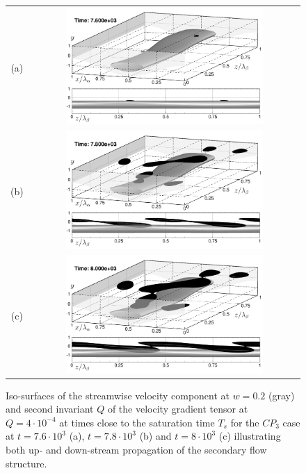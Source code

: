 \documentclass[lineno]{jfm}
\begin{document}
\begin{figure}
\centering
\begin{tabular}{cc}
    (a) & \includegraphics[width=0.75\textwidth]{figure17a.png} \\
    (b) & \includegraphics[width=0.75\textwidth]{figure17b.png} \\
    (c) & \includegraphics[width=0.75\textwidth]{figure17c.png} \\
\end{tabular}
\caption{Iso-surfaces of the streamwise velocity component at $w=0.2$ (gray) and second invariant $Q$ of the velocity gradient tensor at $Q=4\cdot10^{-4}$ at times close to the saturation time $T_s$
for the $CP_3$ case at $t=7.6\cdot10^3$ (a), $t=7.8\cdot10^3$ (b) and $t=8\cdot10^3$ (c) illustrating both up- and down-stream propagation of the secondary flow structure.} 
\label{fig:topo_092_time}
\end{figure}
\end{document}
